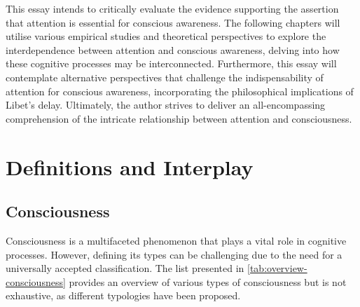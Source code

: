 \documentclass[10pt]{article}
\begin{document}
\begin{sloppypar}
  This essay intends to critically evaluate the evidence supporting the assertion that attention is essential for conscious awareness. The following chapters will utilise various empirical studies and theoretical perspectives to explore the interdependence between attention and conscious awareness, delving into how these cognitive processes may be interconnected. Furthermore, this essay will contemplate alternative perspectives that challenge the indispensability of attention for conscious awareness, incorporating the philosophical implications of Libet’s delay. Ultimately, the author strives to deliver an all-encompassing comprehension of the intricate relationship between attention and consciousness.

  \section{Definitions and Interplay}
  \label{sec:background}

  \subsection{Consciousness}
  \label{sec:consciousness}

  Consciousness is a multifaceted phenomenon that plays a vital role in cognitive processes. However, defining its types can be challenging due to the need for a universally accepted classification. The list presented in \autoref{tab:overview-consciousness} provides an overview of various types of consciousness but is not exhaustive, as different typologies have been proposed.


\end{sloppypar}
\end{document}
